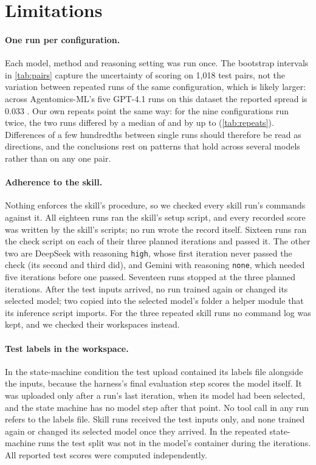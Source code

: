 \section{Limitations}\label{sec:limitations}

\paragraph{One run per configuration.} Each model, method and reasoning setting was run once. The bootstrap intervals
in \cref{tab:pairs} capture the uncertainty of scoring on 1,018 test pairs, not the variation between repeated runs of
the same configuration, which is likely larger: across Agentomics-ML's five GPT-4.1 runs on this dataset the reported
spread is 0.033 \citep[Table 5, given there as the variance between runs]{martinek2025agentomics}. Our own repeats point the same way: for the nine configurations run twice, the two runs differed by a
median of \RepeatMedianDiff{} and by up to \RepeatMaxDiff{} (\cref{tab:repeats}). Differences of a few hundredths between single runs should therefore
be read as directions, and the conclusions rest on patterns that hold across several models rather than on any one pair.


\paragraph{Adherence to the skill.} Nothing enforces the skill's procedure, so we checked every skill run's commands
against it. All eighteen runs ran the skill's setup script, and every recorded score was written by the skill's
scripts; no run wrote the record itself. Sixteen runs ran the check script on each of their three planned iterations
and passed it. The other two are DeepSeek with reasoning \texttt{high}, whose first iteration never passed the check
(its second and third did), and Gemini with reasoning \texttt{none}, which needed five iterations before one passed.
Seventeen runs stopped at the three planned iterations. After the test inputs arrived, no run trained again or changed
its selected model; two copied into the selected model's folder a helper module that its inference script imports.
For the three repeated skill runs no command log was kept, and we checked their workspaces instead.

\paragraph{Test labels in the workspace.} In the state-machine condition the test upload contained its labels file
alongside the inputs, because the harness's final evaluation step scores the model itself. It was uploaded only after a
run's last iteration, when its model had been selected, and the state machine has no model step after that point. No
tool call in any run refers to the labels file. Skill runs received the test inputs only, and none trained again or
changed its selected model once they arrived. In the repeated state-machine runs the test split was not in the model's container during the
iterations. All reported test scores were computed independently.

